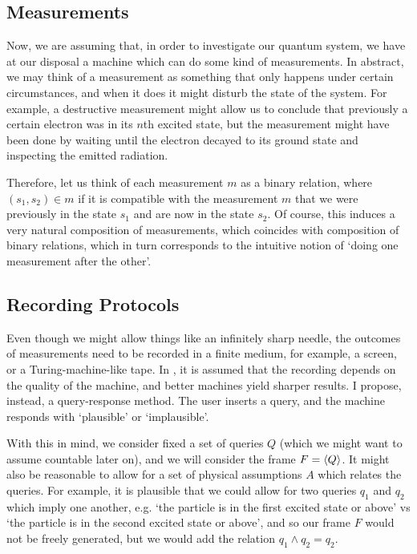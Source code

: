 \documentclass{article}
\theoremstyle{definition}
\theoremstyle{plain}
\begin{document}
\subsection{Measurements}

Now, we are assuming that, in order to investigate our quantum system, we have at our disposal a machine which can do some kind of measurements. In abstract, we may think of a measurement as something that only happens under certain circumstances, and when it does it might disturb the state of the system. For example, a destructive measurement might allow us to conclude that previously a certain electron was in its $n$th excited state, but the measurement might have been done by waiting until the electron decayed to its ground state and inspecting the emitted radiation.

Therefore, let us think of each measurement $m$ as a binary relation, where $(s_1, s_2) \in m$ if it is compatible with the measurement $m$ that we were previously in the state $s_1$ and are now in the state $s_2$. Of course, this induces a very natural composition of measurements, which coincides with composition of binary relations, which in turn corresponds to the intuitive notion of `doing one measurement after the other'.

\subsection{Recording Protocols}

Even though we might allow things like an infinitely sharp needle, the outcomes of measurements need to be recorded in a finite medium, for example, a screen, or a Turing-machine-like tape. In \cite{measurement}, it is assumed that the recording depends on the quality of the machine, and better machines yield sharper results. I propose, instead, a query-response method. The user inserts a query, and the machine responds with `plausible' or `implausible'.

With this in mind, we consider fixed a set of queries $Q$ (which we might want to assume countable later on), and we will consider the frame $F = \braket{Q}$. It might also be reasonable to allow for a set of physical assumptions $A$ which relates the queries. For example, it is plausible that we could allow for two queries $q_1$ and $q_2$ which imply one another, e.g. `the particle is in the first excited state or above' vs `the particle is in the second excited state or above', and so our frame $F$ would not be freely generated, but we would add the relation $q_1 \land q_2 = q_2$.
\end{document}
